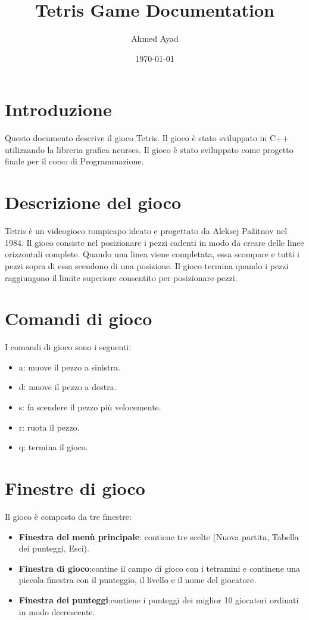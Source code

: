 \documentclass{article}
\title{Tetris Game Documentation}
\author{Ahmed Ayad}
\date{\today}
\begin{document}
\maketitle

\section{Introduzione}
Questo documento descrive il gioco Tetris. Il gioco è stato sviluppato in C++ utilizzando la libreria grafica ncurses.
Il gioco è stato sviluppato come progetto finale per il corso di Programmazione.

\section{Descrizione del gioco}
Tetris è un videogioco rompicapo ideato e progettato da Aleksej Pažitnov nel 1984.
Il gioco consiste nel posizionare i pezzi cadenti in modo da creare delle linee orizzontali complete.
Quando una linea viene completata, essa scompare e tutti i pezzi sopra di essa scendono di una posizione.
Il gioco termina quando i pezzi raggiungono il limite superiore consentito per posizionare pezzi.

\section{Comandi di gioco}
I comandi di gioco sono i seguenti:
\begin{itemize}
\item a: muove il pezzo a sinistra.
\item d: muove il pezzo a destra.
\item s: fa scendere il pezzo più velocemente.
\item r: ruota il pezzo.
\item q: termina il gioco.
\end{itemize}

\section{Finestre di gioco}
Il gioco è composto da tre finestre:
\begin{itemize}
\item \textbf{Finestra del menù principale}: contiene tre scelte (Nuova partita, Tabella dei punteggi, Esci).
\item \textbf{Finestra di gioco}:contine il campo di gioco con i tetramini e continene una piccola finestra con il punteggio, il livello e il nome del giocatore.
\item \textbf{Finestra dei punteggi}:contiene i punteggi dei miglior 10 giocatori ordinati in modo decrescente.
\end{itemize}   
\end{document}
